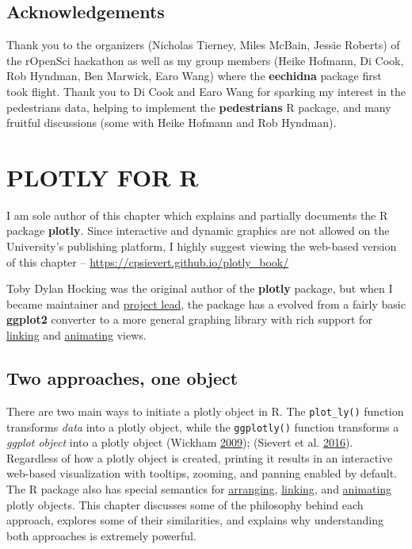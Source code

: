\documentclass[12pt,]{isuthesis}
\begin{document}
\section{Acknowledgements}\label{acknowledgements-1}

Thank you to the organizers (Nicholas Tierney, Miles McBain, Jessie
Roberts) of the rOpenSci hackathon as well as my group members (Heike
Hofmann, Di Cook, Rob Hyndman, Ben Marwick, Earo Wang) where the
\textbf{eechidna} package first took flight. Thank you to Di Cook and
Earo Wang for sparking my interest in the pedestrians data, helping to
implement the \textbf{pedestrians} R package, and many fruitful
discussions (some with Heike Hofmann and Rob Hyndman).

\chapter{PLOTLY FOR R}

I am sole author of this chapter which explains and partially documents
the R package \textbf{plotly}. Since interactive and dynamic graphics
are not allowed on the University's publishing platform, I highly
suggest viewing the web-based version of this chapter --
\url{https://cpsievert.github.io/plotly_book/}

Toby Dylan Hocking was the original author of the \textbf{plotly}
package, but when I became maintainer and
\href{https://github.com/ropensci/plotly/graphs/contributors?from=2015-01-12\&to=2016-11-28\&type=c}{project
lead}, the package has a evolved from a fairly basic \textbf{ggplot2}
converter to a more general graphing library with rich support for
\protect\hyperlink{multiple-linked-views}{linking} and
\protect\hyperlink{animating-views}{animating} views.

\section{Two approaches, one object}\label{two-approaches-one-object}

There are two main ways to initiate a plotly object in R. The
\texttt{plot\_ly()} function transforms \emph{data} into a plotly
object, while the \texttt{ggplotly()} function transforms a \emph{ggplot
object} into a plotly object (Wickham
\protect\hyperlink{ref-ggplot2}{2009}); (Sievert et al.
\protect\hyperlink{ref-plotly}{2016}). Regardless of how a plotly object
is created, printing it results in an interactive web-based
visualization with tooltips, zooming, and panning enabled by default.
The R package also has special semantics for
\protect\hyperlink{arranging-multiple-views}{arranging},
\protect\hyperlink{multiple-linked-views}{linking}, and
\protect\hyperlink{animating-views}{animating} plotly objects. This
chapter discusses some of the philosophy behind each approach, explores
some of their similarities, and explains why understanding both
approaches is extremely powerful.
\end{document}
